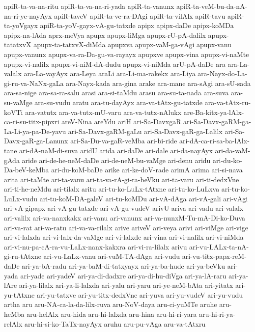 {apiR-ta-va-na-ritu
apiR-ta-va-na-ri-yada
apiR-ta-vanunx
apiR-ta-veM-bu-da-nA-na-ri-ye-nayAyx
apiR-taveV
apiR-ta-ve-ra-DAgi
apiR-ta-vilAlx
apiR-tavu
apiR-ta-yoVgayx
apiR-ta-yoV-gayx-vA-gu-tatxde
apipx
apipx-daDe
apipx-koMDa
apipx-na-lAda
aprx-meVya
apupx
apupx-liMga
apupx-rU-pA-dalilx
apupx-tatatxvX
apupx-ta-tatxvX-diMda
apupxva
apupx-vaM-ga-vAgi
apupx-vanu
apupx-vanunx
apupx-va-ra-Da-gu-va-rayayx
apupxve
apupx-vina
apupx-vi-naMte
apupx-vi-nalilx
apupx-vi-niM-dA-dudu
apupx-vi-niMda
arU-pA-daDe
ara
ara-La-valalx
ara-La-vayAyx
ara-Leya
araLi
ara-Li-ma-rakekx
ara-Liya
ara-Nayx-do-La-gi-ru-va-NaNx-gaLa
ara-Nayx-kada
ara-gina
arake
ara-mane
ara-sAgi
ara-sU-sada
ara-sa-nige
ara-sa-ra-salu
arasi
ara-si-taMdu
arasu
ara-su-ta-nada
ara-suva
ara-su-vaMge
ara-su-vudu
aratu
ara-tu-dayAyx
ara-va-tAtx-gu-tatxde
ara-va-tAtx-ru-koVTi
ara-vatutx
ara-va-tutx-mU-varu
ara-va-tutx-nAlukx
are-Ba-kitx-ya-lAlx-ca-ri-su-titx-pipxri
areV-Nina
areYdu
ariH
ari-Sa-DavxgaR
ari-Sa-Davx-gaRM-ga-La-Li-ya-pa-De-yavu
ari-Sa-Davx-gaRM-gaLu
ari-Sa-Davx-gaR-ga-Lalilx
ari-Sa-Davx-gaR-ga-Lanunx
ari-Sa-Du-va-gaR-veMba
ari-bi-ride
ari-dA-ca-ri-sa-ba-lAlx-tane
ari-dA-naM-di-suva
aridU
arida
ari-daDe
ari-dale
ari-da-nayAyx
ari-da-vaM-gAda
aride
ari-de-he-neM-daDe
ari-de-neM-bu-vaMge
ari-denu
aridu
ari-du-ko-Da-beV-keMba
ari-du-koM-baDe
arike
ari-ke-doV-rade
arimA
arima
ari-si-nava
arita
ari-taMte
ari-ta-vanu
ari-ta-va-rA-gi-ra-beVku
ari-ta-varu
ari-ti-dedxVne
ari-ti-he-neMdu
ari-tilalx
aritu
ari-tu-ko-LuLx-tAtxne
ari-tu-ko-LuLxva
ari-tu-ko-LuLx-vudu
ari-tu-koM-DA-galeV
ari-tu-koMDu
ari-vA-dAga
ari-vA-gali
ari-vAgi
ari-vA-gipapx
ari-vA-gu-tatxde
ari-vA-gu-vudeV
arivU
ariva
ari-vadu
ari-valalx
ari-valilx
ari-va-nanxkakx
ari-vanu
ari-vanunx
ari-va-nunxM-Tu-mA-Di-ko-Duva
ari-va-rat
ari-va-ratu
ari-va-va-rilalx
arive
ariveV
ari-veya
arivi
ari-viMge
ari-vige
ari-vi-lalxda
ari-vi-lalx-da-vaMge
ari-vi-lalxde
ari-vina
ari-vi-nalilx
ari-vi-niMda
ari-vi-nu-pa-cA-ra-vu-LaLx-nanx-kakxra
ari-vi-ra-lilalx
arivu
ari-vu-LALx-ta-nA-gi-ru-tAtxne
ari-vu-LaLx-vanu
ari-vuM-TA-dAga
ari-vudu
ari-vu-titx-papx-reM-daDe
ari-ya-bA-radu
ari-ya-baM-di-tatxyayx
ari-ya-ba-hude
ari-ya-beVku
ari-yada
ari-yade
ari-yadeV
ari-ya-di-dadxre
ari-ya-di-hu-diVga
ari-ya-lA-raru
ari-ya-lAre
ari-ya-lilalx
ari-ya-li-lalxda
ari-yalu
ari-yaru
ari-ye-neM-bAta
ari-yitatx
ari-yu-tAtxne
ari-yu-tatxve
ari-yu-titx-dedxVne
ari-yuva
ari-yu-vudeV
ari-yu-vudu
artha
aru
aru-NA-ca-la-da-lilx-ruva
aru-NoV-daya
aru-ci-yuMTe
aruhe
aru-heMba
aru-helAlx
aru-hida
aru-hi-lalxda
aru-hina
aru-hi-ri-yara
aru-hi-ri-ya-relAlx
aru-hi-si-ko-TaTx-nayAyx
aruhu
aru-pu-vAga
aru-va-tAtxru
}
